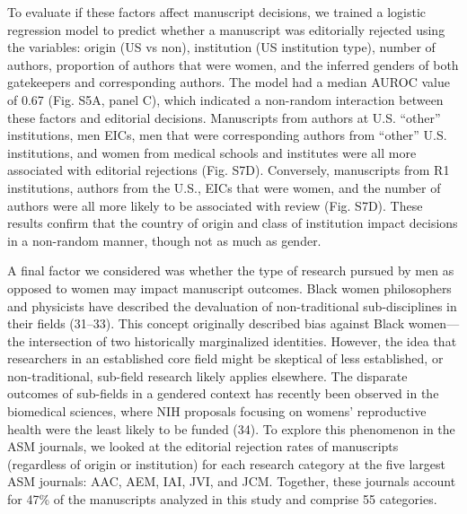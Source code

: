 \documentclass[11pt,]{article}
\begin{document}
To evaluate if these factors affect manuscript decisions, we trained a
logistic regression model to predict whether a manuscript was
editorially rejected using the variables: origin (US vs non),
institution (US institution type), number of authors, proportion of
authors that were women, and the inferred genders of both gatekeepers
and corresponding authors. The model had a median AUROC value of 0.67
(Fig. S5A, panel C), which indicated a non-random interaction between
these factors and editorial decisions. Manuscripts from authors at U.S.
``other'' institutions, men EICs, men that were corresponding authors
from ``other'' U.S. institutions, and women from medical schools and
institutes were all more associated with editorial rejections (Fig.
S7D). Conversely, manuscripts from R1 institutions, authors from the
U.S., EICs that were women, and the number of authors were all more
likely to be associated with review (Fig. S7D). These results confirm
that the country of origin and class of institution impact decisions in
a non-random manner, though not as much as gender.

A final factor we considered was whether the type of research pursued by
men as opposed to women may impact manuscript outcomes. Black women
philosophers and physicists have described the devaluation of
non-traditional sub-disciplines in their fields (31--33). This concept
originally described bias against Black women---the intersection of two
historically marginalized identities. However, the idea that researchers
in an established core field might be skeptical of less established, or
non-traditional, sub-field research likely applies elsewhere. The
disparate outcomes of sub-fields in a gendered context has recently been
observed in the biomedical sciences, where NIH proposals focusing on
womens' reproductive health were the least likely to be funded (34). To
explore this phenomenon in the ASM journals, we looked at the editorial
rejection rates of manuscripts (regardless of origin or institution) for
each research category at the five largest ASM journals: AAC, AEM, IAI,
JVI, and JCM. Together, these journals account for 47\% of the
manuscripts analyzed in this study and comprise 55 categories.
\end{document}
